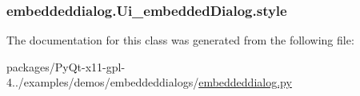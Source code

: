\subsubsection[{style}]{\setlength{\rightskip}{0pt plus 5cm}embeddeddialog.\+Ui\+\_\+embedded\+Dialog.\+style}\label{classembeddeddialog_1_1Ui__embeddedDialog_a1831a09b854b2cacc4f5805a75f9b72e}


The documentation for this class was generated from the following file\+:\begin{DoxyCompactItemize}
\item 
packages/\+Py\+Qt-\/x11-\/gpl-\/4../examples/demos/embeddeddialogs/\hyperlink{embeddeddialog_8py}{embeddeddialog.\+py}\end{DoxyCompactItemize}

